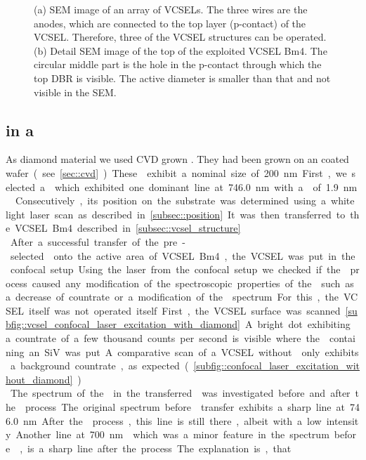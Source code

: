 \begin{figure}[tp]
\begin{subfigure}[t]{ 0.49\linewidth}
{}			\caption{}
			\label{subfig::vcsel_sem_detail}
		\end{subfigure}
		\caption{(a) SEM image of an array of VCSELs. The three wires are the anodes, which are connected to the top layer (p-contact) of the VCSEL. Therefore, three of the VCSEL structures can be operated. (b) Detail SEM image of the top of the exploited VCSEL Bm4. The circular middle part is the hole in the p-contact through which the top DBR is visible. The active diameter is smaller than that and not visible in the SEM.}
	\end{figure}

	\subsection{\siv in a \Vcsel}

	As diamond material we used CVD grown \nds.
	They had been grown on an \ir coated \si wafer (see \autoref{sec::cvd}).
	These \nds exhibit a nominal size of \SI{200}{nm}.
	First, we selected a \nd which exhibited one dominant line at \SI{746.0}{nm} with a \lw of \SI{1.9}{nm}.
	Consecutively, its position on the substrate was determined using a white light laser scan as described in \autoref{subsec::position}.
	It was then transferred to the VCSEL Bm4 described in \autoref{subsec::vcsel_structure}.
	\\
	After a successful transfer of the pre-selected \nd onto the active area of VCSEL Bm4, the VCSEL was put in the confocal setup.
	Using the laser from the confocal setup we checked if the \pp process caused any modification of the spectroscopic properties of the \siv such as a decrease of countrate or a modification of the \fl spectrum.
	For this, the VCSEL itself was not operated itself.
	First, the VCSEL surface was scanned \autoref{subfig::vcsel_confocal_laser_excitation_with_diamond}.
	.
	A bright dot exhibiting a countrate of a few thousand counts per second is visible where the \nd containing an SiV was put.
	A comparative scan of a VCSEL without \nd only exhibits a background countrate, as expected (\autoref{subfig::confocal_laser_excitation_without_diamond}).
	\\
	The spectrum of the \siv in the transferred \nd was investigated before and after the \pp process.
	The original spectrum before \nd transfer exhibits a sharp line at \SI{746.0}{nm}.
	After the \pp process, this line is still there, albeit with a low intensity.
	Another line at \SI{700}{nm}  which was a minor feature in the spectrum before \pp, is a sharp line after the process. 
	The explanation is, that 




